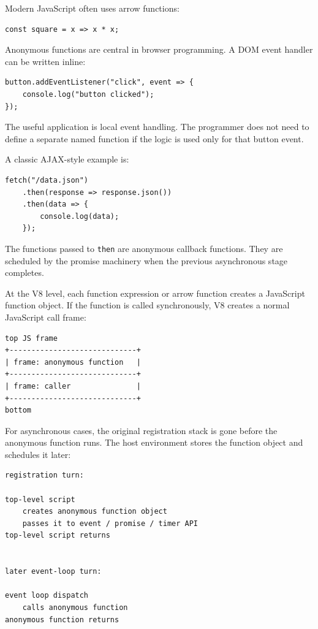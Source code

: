 Modern JavaScript often uses arrow functions:

\begin{verbatim}
const square = x => x * x;
\end{verbatim}

Anonymous functions are central in browser programming. A DOM event handler can be written inline:

\begin{verbatim}
button.addEventListener("click", event => {
    console.log("button clicked");
});
\end{verbatim}

The useful application is local event handling. The programmer does not need to define a separate named function if the logic is used only for that button event.

A classic AJAX-style example is:

\begin{verbatim}
fetch("/data.json")
    .then(response => response.json())
    .then(data => {
        console.log(data);
    });
\end{verbatim}

The functions passed to \texttt{then} are anonymous callback functions. They are scheduled by the promise machinery when the previous asynchronous stage completes.

At the V8 level, each function expression or arrow function creates a JavaScript function object. If the function is called synchronously, V8 creates a normal JavaScript call frame:

\begin{verbatim}
top JS frame
+-----------------------------+
| frame: anonymous function   |
+-----------------------------+
| frame: caller               |
+-----------------------------+
bottom
\end{verbatim}

For asynchronous cases, the original registration stack is gone before the anonymous function runs. The host environment stores the function object and schedules it later:

\begin{verbatim}
registration turn:

top-level script
    creates anonymous function object
    passes it to event / promise / timer API
top-level script returns


later event-loop turn:

event loop dispatch
    calls anonymous function
anonymous function returns
\end{verbatim}

